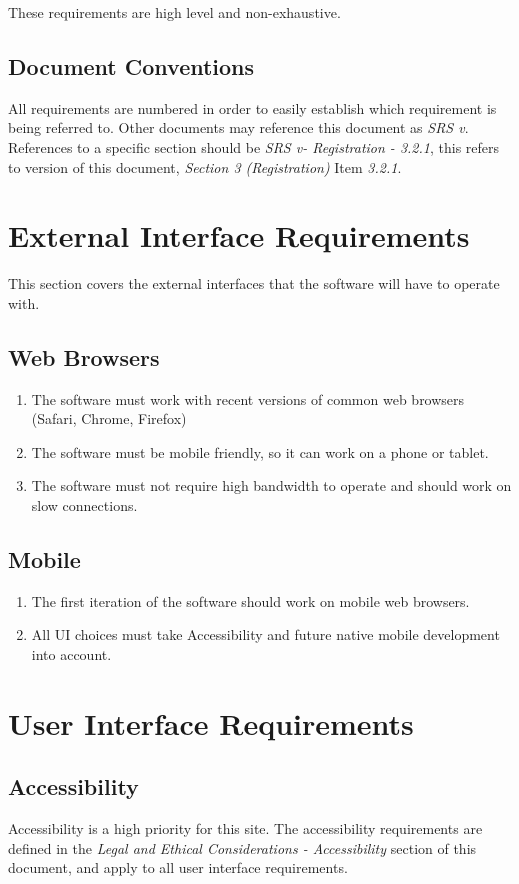 These requirements are high level and non-exhaustive.

\subsection{Document Conventions}
All requirements are numbered in order to easily establish which requirement is being referred to.
Other documents may reference this document as \emph{SRS v\currentVersion}.
References to a specific section should be \emph{SRS v\currentVersion - Registration - 3.2.1}, this refers to version \textit{\currentVersion} of this document, \textit{Section 3 (Registration)} Item \textit{3.2.1}.


\newpage %
\section{External Interface Requirements}
	This section covers the external interfaces that the software will have to operate with.
	\subsection{Web Browsers}
		\begin{enumerate}[leftmargin=3\parindent]
			\item The software must work with recent versions of common web browsers (Safari, Chrome, Firefox)
			\item The software must be mobile friendly, so it can work on a phone or tablet.
			\item The software must not require high bandwidth to operate and should work on slow connections.
		\end{enumerate}
	\subsection{Mobile}
		\begin{enumerate}[leftmargin=3\parindent]
			\item The first iteration of the software should work on mobile web browsers.
			\item  All UI choices must take Accessibility and future native mobile development into account.
		\end{enumerate}


\newpage %
\section{User Interface Requirements}
	\subsection{Accessibility}
		Accessibility is a high priority for this site. The accessibility requirements are defined in the \emph{Legal and Ethical Considerations - Accessibility} section of this document, and apply to all user interface requirements.
